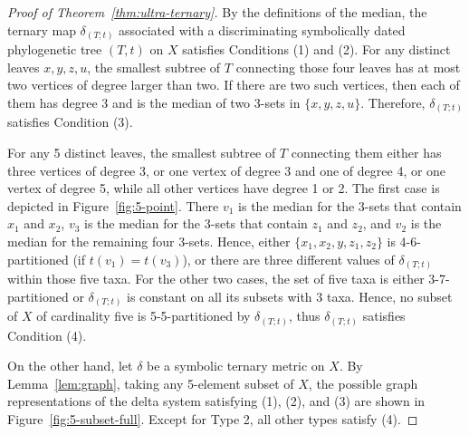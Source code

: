 \documentclass{article}
\newcommand{\TODO}[1]{\begingroup\color{red}#1\endgroup}
\begin{document}
\begin{proof}[Proof of Theorem~\ref{thm:ultra-ternary}]
By the definitions of the median, the ternary map $\delta_{(T;t)}$ 
associated with a discriminating
symbolically dated phylogenetic tree $(T,t)$ on $X$ satisfies Conditions 
(1) and (2). For any distinct leaves $x,y,z,u$, the smallest subtree of $T$ connecting 
those four leaves has at most two vertices of degree larger than two. If there are two such vertices,
then each of them has degree 3 and is the median of two 3-sets in $\{x,y,z,u\}$.
Therefore, $\delta_{(T;t)}$ satisfies Condition (3).

For any 5 distinct leaves, the smallest subtree of $T$ connecting them either has 
three vertices of degree 3, or one vertex of degree 3 and one of degree 4, or one 
vertex of degree 5, while all other vertices have degree 1 or 2. The first case is depicted in 
Figure~\ref{fig:5-point}. There $v_1$ is the median for the 3-sets that contain $x_1$ and $x_2$, 
$v_3$ is the  median for the 3-sets that contain $z_1$ and $z_2$, and $v_2$ is the median for the 
remaining four 3-sets. Hence, either $\{x_1,x_2,y,z_1,z_2\}$ is 4-6-partitioned 
(if $t(v_1)=t(v_3)$), or 
there are three different values of $\delta_{(T;t)}$ within those five taxa. For the other two cases, 
the set of five taxa is either 3-7-partitioned or $\delta_{(T;t)}$ is constant on all its subsets with 3 taxa. 
Hence, no subset of $X$ of cardinality 
five is 5-5-partitioned by $\delta_{(T;t)}$, thus $\delta_{(T;t)}$ satisfies Condition (4). 

% 
% 
On the other hand, let $\delta$ be a symbolic ternary metric on $X$. 
By Lemma~\ref{lem:graph}, taking any 5-element subset of $X$,
 the possible graph representations of the delta system satisfying (1), (2), and (3) 
are 
shown in Figure~\ref{fig:5-subset-full}. Except for Type 2, all other types 
satisfy (4).



\end{proof}
\end{document}
